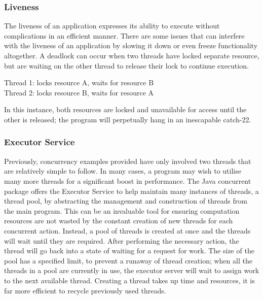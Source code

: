 \documentclass[a4paper,12pt]{article}
\begin{document}
\subsubsection{Liveness}
The liveness of an application expresses its ability to execute without complications in an efficient manner. There are some issues that can interfere with the liveness of an application by slowing it down or even freeze functionality altogether. A deadlock can occur when two threads have locked separate resource, but are waiting on the other thread to release their lock to continue execution. 

\vspace{2pt}
\begin{center}
\noindent Thread 1: locks resource A, waits for resource B
\\Thread 2: locks resource B, waits for resource A 
\end{center}
\vspace{2pt}

In this instance, both resources are locked and unavailable for access until the other is released; the program will perpetually hang in an inescapable catch-22.  


\subsubsection{Executor Service} \label{section:Executor Service}
Previously, concurrency examples provided have only involved two threads that are relatively simple to follow. In many cases, a program may wish to utilise many more threads for a significant boost in performance. The Java concurrent package offers the Executor Service to help maintain many instances of threads, a thread pool, by abstracting the management and construction of threads from the main program. This can be an invaluable tool for ensuring computation resources are not wasted by the constant creation of new threads for each concurrent action. Instead, a pool of threads is created at once and the threads will wait until they are required. After performing the necessary action, the thread will go back into a state of waiting for a request for work. The size of the pool has a specified limit, to prevent a runaway of thread creation; when all the threads in a pool are currently in use, the executor server will wait to assign work to the next available thread. Creating a thread takes up time and resources, it is far more efficient to recycle previously used threads. 
\end{document}

